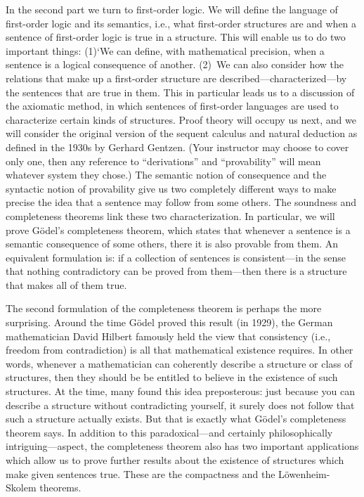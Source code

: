 In the second part we turn to first-order logic. We will define the
language of first-order logic and its semantics, i.e., what
first-order structures are and when a sentence of first-order logic is
true in a structure. This will enable us to do two important things:
(1)`We can define, with mathematical precision, when a sentence is a
logical consequence of another. (2)~We can also consider how the
relations that make up a first-order structure are
described---characterized---by the sentences that are true in them.
This in particular leads us to a discussion of the axiomatic method,
in which sentences of first-order languages are used to characterize
certain kinds of structures. Proof theory will occupy us next, and we
will consider the original version of the sequent calculus and natural
deduction as defined in the 1930s by Gerhard Gentzen. (Your instructor
may choose to cover only one, then any reference to ``derivations''
and ``provability'' will mean whatever system they chose.) The
semantic notion of consequence and the syntactic notion of provability
give us two completely different ways to make precise the idea that a
sentence may follow from some others. The soundness and completeness
theorems link these two characterization. In particular, we will prove
G\"odel's completeness theorem, which states that whenever a sentence
is a semantic consequence of some others, there it is also provable
from them. An equivalent formulation is: if a collection of sentences
is consistent---in the sense that nothing contradictory can be proved
from them---then there is a structure that makes all of them true.

The second formulation of the completeness theorem is perhaps the more
surprising. Around the time G\"odel proved this result (in 1929), the
German mathematician David Hilbert famously held the view that
consistency (i.e., freedom from contradiction) is all that mathematical
existence requires. In other words, whenever a mathematician can
coherently describe a structure or class of structures, then they
should be be entitled to believe in the existence of such structures.
At the time, many found this idea preposterous: just because you can
describe a structure without contradicting yourself, it surely does
not follow that such a structure actually exists. But that is exactly
what G\"odel's completeness theorem says. In addition to this
paradoxical---and certainly philosophically intriguing---aspect, the
completeness theorem also has two important applications which allow
us to prove further results about the existence of structures which
make given sentences true. These are the compactness and the
L\"owenheim-Skolem theorems.

